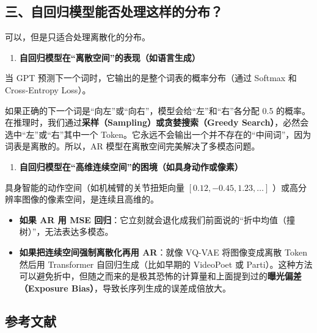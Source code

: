 \hypertarget{ux4e09ux81eaux56deux5f52ux6a21ux578bux80fdux5426ux5904ux7406ux8fd9ux6837ux7684ux5206ux5e03}{%
\subsection{三、自回归模型能否处理这样的分布？}\label{ux4e09ux81eaux56deux5f52ux6a21ux578bux80fdux5426ux5904ux7406ux8fd9ux6837ux7684ux5206ux5e03}}

可以，但是只适合处理离散化的分布。

\begin{enumerate}
\def\labelenumi{\arabic{enumi}.}
\tightlist
\item
  \textbf{自回归模型在``离散空间''的表现（如语言生成）}
\end{enumerate}

当 GPT 预测下一个词时，它输出的是整个词表的概率分布（通过 Softmax 和 Cross-Entropy Loss）。

如果正确的下一个词是``向左''或``向右''，模型会给``左''和``右''各分配 0.5 的概率。在推理时，我们通过\textbf{采样（Sampling）或贪婪搜索（Greedy Search）}，必然会选中``左''或``右''其中一个 Token。它永远不会输出一个并不存在的``中间词''，因为词表是离散的。所以，AR 模型在离散空间完美解决了多模态问题。

\begin{enumerate}
\def\labelenumi{\arabic{enumi}.}
\setcounter{enumi}{1}
\tightlist
\item
  \textbf{自回归模型在``高维连续空间''的困境（如具身动作或像素）}
\end{enumerate}

具身智能的动作空间（如机械臂的关节扭矩向量 \([0.12, -0.45, 1.23, \ldots]\) ）或高分辨率图像的像素空间，是连续且高维的。

\begin{itemize}
\tightlist
\item
  \textbf{如果 AR 用 MSE 回归}：它立刻就会退化成我们前面说的``折中均值（撞树）''，无法表达多模态。
\item
  \textbf{如果把连续空间强制离散化再用 AR}：就像 VQ-VAE 将图像变成离散 Token 然后用 Transformer 自回归生成（比如早期的 VideoPoet 或 Parti）。这种方法可以避免折中，但随之而来的是极其恐怖的计算量和上面提到过的\textbf{曝光偏差（Exposure Bias）}，导致长序列生成的误差成倍放大。
\end{itemize}

\hypertarget{ux53c2ux8003ux6587ux732e-132}{%
\subsection{参考文献}\label{ux53c2ux8003ux6587ux732e-132}}

